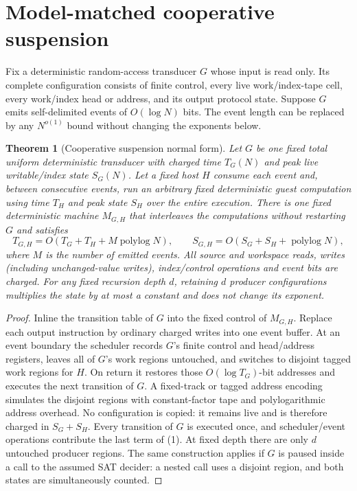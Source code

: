\documentclass[11pt]{article}
\newtheorem{theorem}{Theorem}
\begin{document}
\section{Model-matched cooperative suspension}
Fix a deterministic random-access transducer $G$ whose input is read only.  Its
complete configuration consists of finite control, every live work/index-tape
cell, every work/index head or address, and its output protocol state.  Suppose
$G$ emits self-delimited events of $O(\log N)$ bits.  The event length can be
replaced by any $N^{o(1)}$ bound without changing the exponents below.

\begin{theorem}[Cooperative suspension normal form]\label{th:coop}
Let $G$ be one fixed total uniform deterministic transducer with charged time
$T_G(N)$ and peak live writable/index state $S_G(N)$.  Let a fixed host $H$
consume each event and, between consecutive events, run an arbitrary fixed
deterministic guest computation using time $T_H$ and peak state $S_H$ over the
entire execution.  There is one fixed deterministic machine $M_{G,H}$ that
interleaves the computations without restarting $G$ and satisfies
\[
T_{G,H}=O(T_G+T_H+M\operatorname{polylog}N),\qquad
S_{G,H}=O(S_G+S_H+\operatorname{polylog}N),                 \tag{1}
\]
where $M$ is the number of emitted events.  All source and workspace reads,
writes (including unchanged-value writes), index/control operations and event
bits are charged.  For any fixed recursion depth $d$, retaining $d$ producer
configurations multiplies the state by at most a constant and does not change
its exponent.
\end{theorem}
\begin{proof}
Inline the transition table of $G$ into the fixed control of $M_{G,H}$.  Replace
each output instruction by ordinary charged writes into one event buffer.  At
an event boundary the scheduler records $G$'s finite control and head/address
registers, leaves all of $G$'s work regions untouched, and switches to disjoint
tagged work regions for $H$.  On return it restores those $O(\log T_G)$-bit
addresses and executes the next transition of $G$.  A fixed-track or tagged
address encoding simulates the disjoint regions with constant-factor tape and
polylogarithmic address overhead.  No configuration is copied: it remains live
and is therefore charged in $S_G+S_H$.  Every transition of $G$ is executed once,
and scheduler/event operations contribute the last term of (1).  At fixed depth
there are only $d$ untouched producer regions.  The same construction applies
if $G$ is paused inside a call to the assumed SAT decider: a nested call uses a
disjoint region, and both states are simultaneously counted.
\end{proof}
\end{document}
